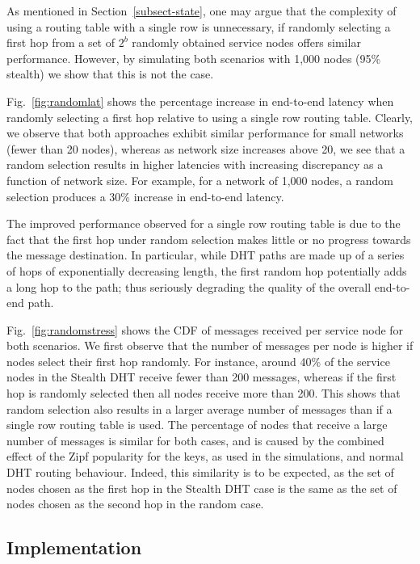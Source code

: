 \documentclass[letterpaper]{sig-alternate} %
\begin{document}
As mentioned in Section~\ref{subsect-state}, one may argue that the complexity
of using a routing table with a single row is unnecessary, if randomly
selecting a first hop from a set of $2^b$ randomly obtained service nodes
offers similar performance. However, by simulating both scenarios with 1,000
nodes (95\% stealth) we show that this is not the case.

Fig.~\ref{fig:randomlat} shows the percentage increase in end-to-end latency
when randomly selecting a first hop relative to using a single row routing
table. Clearly, we observe that both approaches exhibit similar performance for
small networks (fewer than 20 nodes), whereas as network size increases above
20, we see that a random selection results in higher latencies with increasing
discrepancy as a function of network size. For example, for a network of 1,000
nodes, a random selection produces a 30\% increase in end-to-end latency.

The improved performance observed for a single row routing table is due to the
fact that the first hop under random selection makes little or no progress
towards the message destination. In particular, while DHT paths are made up of
a series of hops of exponentially decreasing length, the first random hop
potentially adds a long hop to the path; thus seriously degrading the quality
of the overall end-to-end path.

Fig.~\ref{fig:randomstress} shows the CDF of messages received per service node
for both scenarios. We first observe that the number of messages per node is
higher if nodes select their first hop randomly. For instance, around 40\% of
the service nodes in the Stealth DHT receive fewer than 200 messages, whereas
if the first hop is randomly selected then all nodes receive more than 200.
This shows that random selection also results in a larger average number of
messages than if a single row routing table is used. The percentage of nodes
that receive a large number of messages is similar for both cases, and is
caused by the combined effect of the Zipf popularity for the keys, as used in
the simulations, and normal DHT routing behaviour. Indeed, this similarity is
to be expected, as the set of nodes chosen as the first hop in the Stealth DHT
case is the same as the set of nodes chosen as the second hop in the random
case.

\subsection{Implementation}
\label{subsect-impl}
\end{document}
